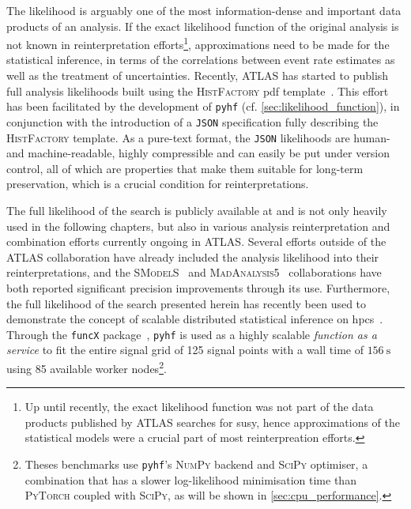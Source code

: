 The likelihood is arguably one of the most information-dense and important data products of an analysis.
If the exact likelihood function of the original analysis is not known in reinterpretation efforts\footnote{Up until recently, the exact likelihood function was not part of the data products published by ATLAS searches for \gls{susy}, hence approximations of the statistical models were a crucial part of most reinterpreation efforts.}, approximations need to be made for the statistical inference, \eg in terms of the correlations between event rate estimates as well as the treatment of uncertainties.
Recently, ATLAS has started to publish full analysis likelihoods built using the \textsc{HistFactory} \gls{pdf} template~\cite{ATL-PHYS-PUB-2019-029}.
This effort has been facilitated by the development of \texttt{pyhf} (cf. \cref{sec:likelihood_function}), in conjunction with the introduction of a \texttt{JSON} specification fully describing the \textsc{HistFactory} template.
As a pure-text format, the \texttt{JSON} likelihoods are human- and machine-readable, highly compressible and can easily be put under version control, all of which are properties that make them suitable for long-term preservation, which is a crucial condition for reinterpretations.

The full likelihood of the \onelepton search is publicly available at \cite{fullLH_1Lbb} and is not only heavily used in the following chapters, but also in various analysis reinterpretation and combination efforts currently ongoing in ATLAS.
Several efforts outside of the ATLAS collaboration have already included the analysis likelihood into their reinterpretations, and the \textsc{SModelS}~\cite{SModelS_pyhf:2020grj} and \textsc{MadAnalysis5}~\cite{Goodsell:2020ddr,Fuks:2021wpe} collaborations have both reported significant precision improvements through its use. Furthermore, the full likelihood of the search presented herein has recently been used to demonstrate the concept of scalable distributed statistical inference on \glspl{hpc}~\cite{Feickert:2021sua}.
Through the \texttt{funcX} package~\cite{chard20funcx}, \texttt{pyhf} is used as a highly scalable \textit{function as a service} to fit the entire \onelepton signal grid of 125 signal points with a wall time of $\SI{156}{\second}$ using 85 available worker nodes\footnote{Theses benchmarks use \texttt{pyhf}'s \textsc{NumPy} backend and \textsc{SciPy} optimiser, a combination that has a slower log-likelihood minimisation time than \eg \textsc{PyTorch} coupled with \textsc{SciPy}, as will be shown in \cref{sec:cpu_performance}.}.

